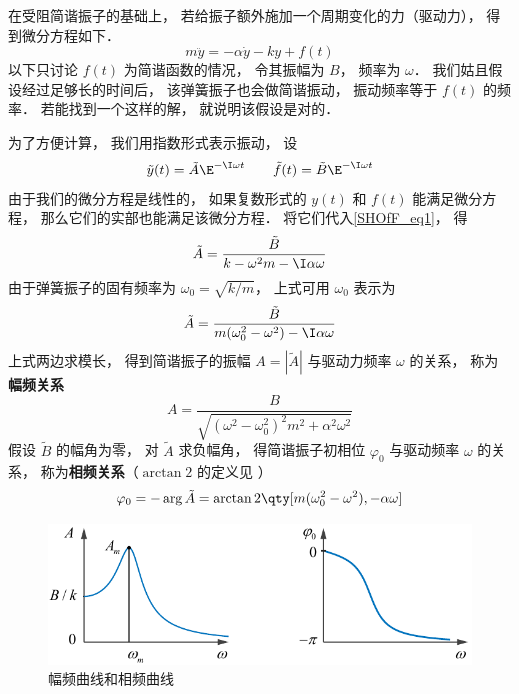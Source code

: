

在受阻简谐振子的基础上， 若给振子额外施加一个周期变化的力（驱动力）， 得到微分方程如下．
\begin{equation}\label{SHOfF_eq1}
m\ddot y = -\alpha \dot y - ky + f(t)
\end{equation}
以下只讨论 $f(t)$ 为简谐函数的情况， 令其振幅为 $B$， 频率为 $\omega$． 我们姑且假设经过足够长的时间后， 该弹簧振子也会做简谐振动， 振动频率等于 $f(t)$ 的频率． 若能找到一个这样的解， 就说明该假设是对的．

为了方便计算， 我们用指数形式表示振动， 设
\begin{equation}
\tilde y(t) = \tilde A\E^{-\I\omega t} \qquad
\tilde f(t) = \tilde B\E^{-\I \omega t}
\end{equation}
由于我们的微分方程是线性的， 如果复数形式的 $y(t)$ 和 $f(t)$ 能满足微分方程， 那么它们的实部也能满足该微分方程． 将它们代入\autoref{SHOfF_eq1}， 得
\begin{equation}
\tilde A =  \frac{\tilde B}{k -\omega^2 m - \I\alpha\omega}
\end{equation}
由于弹簧振子的固有频率为 $\omega_0 = \sqrt{k/m}$， 上式可用 $\omega_0$ 表示为
\begin{equation}
\tilde A = \frac{\tilde B}{m(\omega_0^2 - \omega^2) - \I\alpha\omega}
\end{equation}
上式两边求模长， 得到简谐振子的振幅 $A = |\tilde A|$ 与驱动力频率 $\omega$ 的关系， 称为\textbf{幅频关系}
\begin{equation}\label{SHOfF_eq5}
A = \frac{B}{\sqrt{(\omega^2 - \omega_0^2)^2 m^2 + \alpha^2\omega^2}}
\end{equation}
假设 $\tilde B$ 的幅角为零， 对 $\tilde A$ 求负幅角， 得简谐振子初相位 $\varphi_0$ 与驱动频率 $\omega$ 的关系， 称为\textbf{相频关系}（$\arctan2$ 的定义见%
）
\begin{equation}\label{SHOfF_eq6}
\varphi_0 = -\arg \tilde A = \arctan2 \qty[m(\omega_0^2 - \omega^2), -\alpha\omega]
\end{equation}

\begin{figure}[ht]
\centering
\includegraphics[width=12cm]{./figures/SHOfF1.pdf}
\caption{幅频曲线和相频曲线} \label{SHOfF_fig1}
\end{figure}

